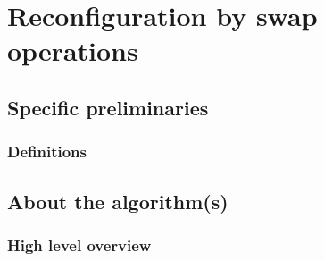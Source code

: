 \section{Reconfiguration by swap operations}

\subsection{Specific preliminaries}

\subsubsection{Definitions}

\subsection{About the algorithm(s)}

\subsubsection{High level overview}

\cite{siamcomp/DemaineFKMS19} 
